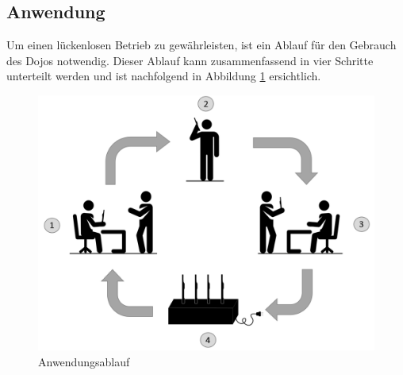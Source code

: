 \subsection{Anwendung}\label{sec:anwendung}

Um einen lückenlosen Betrieb zu gewährleisten, ist ein Ablauf für den Gebrauch des Dojos notwendig. Dieser Ablauf kann zusammenfassend in vier Schritte unterteilt werden und ist nachfolgend in Abbildung \ref{fig:Anwendungsablauf Dojo} ersichtlich.

\begin{figure}[H]
	\begin{center}
		\includegraphics[width=140mm]{data/Ladezyklus.png}
		\caption[Anwendungsablauf des Dojos]{Anwendungsablauf} %
		\label{fig:Anwendungsablauf Dojo}
	\end{center}
\end{figure}

